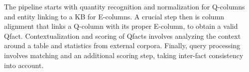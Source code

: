 The pipeline starts with quantity recognition and
normalization for Q-columns and
entity linking to a KB for E-columns.
A crucial step then is 
column alignment that links a Q-column
with its proper E-column, to obtain a valid Qfact. %
Contextualization and scoring of Qfacts involves
analyzing the 
context
around a table
and statistics from external corpora. Finally,
query processing involves matching and an additional
scoring step, taking inter-fact consistency into account.


